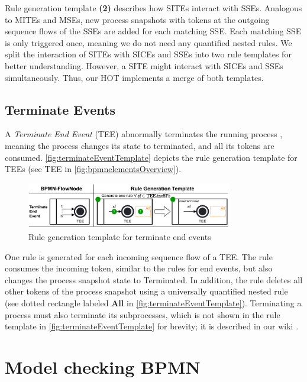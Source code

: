 \documentclass{lmcs} %
\begin{document}
Rule generation template \textbf{(2)} describes how SITEs interact with SSEs.
Analogous to MITEs and MSEs, new process snapshots with tokens at the outgoing sequence flows of the SSEs are added for each matching SSE.
Each matching SSE is only triggered once, meaning we do not need any quantified nested rules.
We split the interaction of SITEs with SICEs and SSEs into two rule templates for better understanding.
However, a SITE might interact with SICEs and SSEs simultaneously.
Thus, our HOT implements a merge of both templates.

\subsection{Terminate Events}
A \textit{Terminate End Event} (TEE) abnormally terminates the running process \cite{objectmanagementgroupBusinessProcessModel2013}, meaning the process changes its state to terminated, and all its tokens are consumed.
\autoref{fig:terminateEventTemplate} depicts the rule generation template for TEEs (see \textsf{TEE} in \autoref{fig:bpmnelementsOverview}).

\begin{figure}[ht]
    \centering
    \includegraphics[width=0.8\textwidth]{images/terminate_end_event_template.pdf}
    \caption{Rule generation template for terminate end events}
    \label{fig:terminateEventTemplate}
\end{figure}

One rule is generated for each incoming sequence flow of a TEE.
The rule consumes the incoming token, similar to the rules for end events, but also changes the process snapshot state to \textsf{Terminated}.
In addition, the rule deletes all other tokens of the process snapshot using a universally quantified nested rule (see dotted rectangle labeled \textbf{All} in \autoref{fig:terminateEventTemplate}).
Terminating a process must also terminate its subprocesses, which is not shown in the rule template in \autoref{fig:terminateEventTemplate} for brevity; it is described in our wiki \cite{timkrauterLMCS2024Artifacts2023}.

\section{Model checking BPMN} \label{sec:modelChecking}
\end{document}

